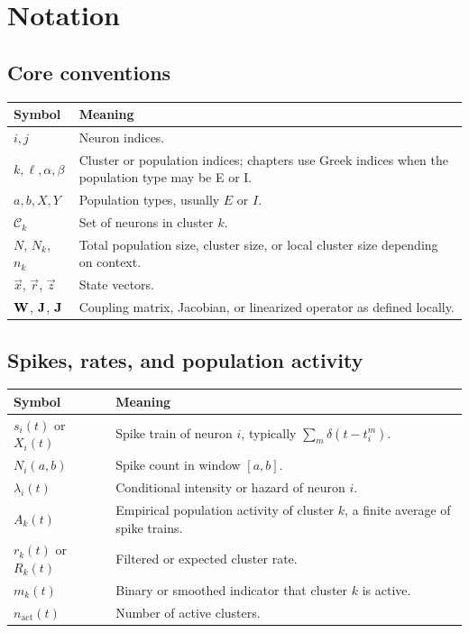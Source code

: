 \chapter*{Notation}

\section*{Core conventions}

\begin{tabularx}{\textwidth}{@{}p{}X@{}}
  \toprule
  \textbf{Symbol} & \textbf{Meaning} \\
  \midrule
  $i,j$ & Neuron indices. \\
  $k,\ell,\alpha,\beta$ & Cluster or population indices; chapters use Greek indices when the population type may be E or I. \\
  $a,b,X,Y$ & Population types, usually $E$ or $I$. \\
  $\mathcal{C}_k$ & Set of neurons in cluster $k$. \\
  $N$, $N_k$, $n_k$ & Total population size, cluster size, or local cluster size depending on context. \\
  $\vec{x}$, $\vec r$, $\vec z$ & State vectors. \\
  $\mathbf{W}$, $\mathbf{J}$, $\mathbf{J}$ & Coupling matrix, Jacobian, or linearized operator as defined locally. \\
  \bottomrule
\end{tabularx}

\section*{Spikes, rates, and population activity}

\begin{tabularx}{\textwidth}{@{}p{}X@{}}
  \toprule
  \textbf{Symbol} & \textbf{Meaning} \\
  \midrule
  $s_i(t)$ or $X_i(t)$ & Spike train of neuron $i$, typically $\sum_m \delta(t-t_i^m)$. \\
  $N_i(a,b)$ & Spike count in window $[a,b]$. \\
  $\lambda_i(t)$ & Conditional intensity or hazard of neuron $i$. \\
  $A_k(t)$ & Empirical population activity of cluster $k$, a finite average of spike trains. \\
  $r_k(t)$ or $R_k(t)$ & Filtered or expected cluster rate. \\
  $m_k(t)$ & Binary or smoothed indicator that cluster $k$ is active. \\
  $n_{\mathrm{act}}(t)$ & Number of active clusters. \\
  \bottomrule
\end{tabularx}

